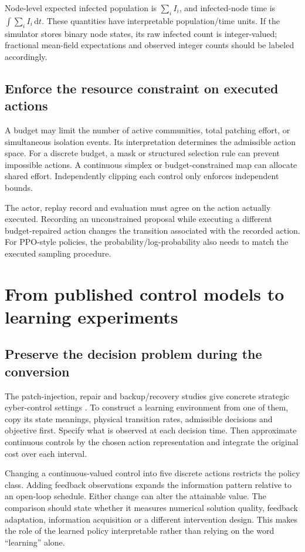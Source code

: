 \documentclass[11pt,a4paper]{article}
\newcommand{\dd}{\,\mathrm{d}}
\theoremstyle{definition}
\theoremstyle{remark}
\begin{document}
Node-level expected infected population is $\sum_i I_i$, and infected-node time is $\int\sum_iI_i\dd t$. These quantities have interpretable population/time units. If the simulator stores binary node states, its raw infected count is integer-valued; fractional mean-field expectations and observed integer counts should be labeled accordingly.

\subsection{Enforce the resource constraint on executed actions}
A budget may limit the number of active communities, total patching effort, or simultaneous isolation events. Its interpretation determines the admissible action space. For a discrete budget, a mask or structured selection rule can prevent impossible actions. A continuous simplex or budget-constrained map can allocate shared effort. Independently clipping each control only enforces independent bounds.

The actor, replay record and evaluation must agree on the action actually executed. Recording an unconstrained proposal while executing a different budget-repaired action changes the transition associated with the recorded action. For PPO-style policies, the probability/log-probability also needs to match the executed sampling procedure.


\section{From published control models to learning experiments}
\subsection{Preserve the decision problem during the conversion}
The patch-injection, repair and backup/recovery studies give concrete strategic cyber-control settings \cite{patch2018,repair2019,backup2021}. To construct a learning environment from one of them, copy its state meanings, physical transition rates, admissible decisions and objective first. Specify what is observed at each decision time. Then approximate continuous controls by the chosen action representation and integrate the original cost over each interval.

Changing a continuous-valued control into five discrete actions restricts the policy class. Adding feedback observations expands the information pattern relative to an open-loop schedule. Either change can alter the attainable value. The comparison should state whether it measures numerical solution quality, feedback adaptation, information acquisition or a different intervention design. This makes the role of the learned policy interpretable rather than relying on the word ``learning'' alone.
\end{document}
